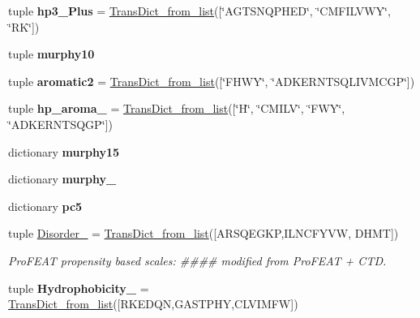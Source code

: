 \begin{DoxyCompactItemize}
\item 
\hypertarget{namespacefeat__extract_1_1_a_alphabets_a948f0c4ce14782492fa9b515f195768a}{}tuple {\bfseries hp3\+\_\+\+Plus} = \hyperlink{namespacefeat__extract_1_1_a_alphabets_acdda8523b57175e0e79064c4da723c5d}{Trans\+Dict\+\_\+from\+\_\+list}(\mbox{[}\char`\"{}A\+G\+T\+S\+N\+Q\+P\+H\+E\+D\char`\"{}, \char`\"{}C\+M\+F\+I\+L\+V\+W\+Y\char`\"{}, \char`\"{}R\+K\char`\"{}\mbox{]})\label{namespacefeat__extract_1_1_a_alphabets_a948f0c4ce14782492fa9b515f195768a}

\item 
tuple {\bfseries murphy10}
\item 
\hypertarget{namespacefeat__extract_1_1_a_alphabets_a73485d177e473b15ac9814b8c1205231}{}tuple {\bfseries aromatic2} = \hyperlink{namespacefeat__extract_1_1_a_alphabets_acdda8523b57175e0e79064c4da723c5d}{Trans\+Dict\+\_\+from\+\_\+list}(\mbox{[}\char`\"{}F\+H\+W\+Y\char`\"{}, \char`\"{}A\+D\+K\+E\+R\+N\+T\+S\+Q\+L\+I\+V\+M\+C\+G\+P\char`\"{}\mbox{]})\label{namespacefeat__extract_1_1_a_alphabets_a73485d177e473b15ac9814b8c1205231}

\item 
\hypertarget{namespacefeat__extract_1_1_a_alphabets_a985e03ae7f398065cf54b12b80d822d2}{}tuple {\bfseries hp\+\_\+aroma\+\_} = \hyperlink{namespacefeat__extract_1_1_a_alphabets_acdda8523b57175e0e79064c4da723c5d}{Trans\+Dict\+\_\+from\+\_\+list}(\mbox{[}\char`\"{}H\char`\"{}, \char`\"{}C\+M\+I\+L\+V\char`\"{}, \char`\"{}F\+W\+Y\char`\"{}, \char`\"{}A\+D\+K\+E\+R\+N\+T\+S\+Q\+G\+P\char`\"{}\mbox{]})\label{namespacefeat__extract_1_1_a_alphabets_a985e03ae7f398065cf54b12b80d822d2}

\item 
dictionary {\bfseries murphy15}
\item 
dictionary {\bfseries murphy\+\_}
\item 
dictionary {\bfseries pc5}
\item 
tuple \hyperlink{namespacefeat__extract_1_1_a_alphabets_aa82e15fb161a0799d632bdadd04c5b99}{Disorder\+\_} = \hyperlink{namespacefeat__extract_1_1_a_alphabets_acdda8523b57175e0e79064c4da723c5d}{Trans\+Dict\+\_\+from\+\_\+list}(\mbox{[}\textquotesingle{}A\+R\+S\+Q\+E\+G\+K\+P\textquotesingle{},\textquotesingle{}I\+L\+N\+C\+F\+Y\+V\+W\textquotesingle{}, \textquotesingle{}D\+H\+M\+T\textquotesingle{}\mbox{]})
\begin{DoxyCompactList}\small\item\em Pro\+F\+E\+A\+T propensity based scales\+: \#\#\#\# modified from Pro\+F\+E\+A\+T + C\+T\+D. \end{DoxyCompactList}\item 
\hypertarget{namespacefeat__extract_1_1_a_alphabets_a4beaeb51c7e1f055ee39c48049652521}{}tuple {\bfseries Hydrophobicity\+\_} = \hyperlink{namespacefeat__extract_1_1_a_alphabets_acdda8523b57175e0e79064c4da723c5d}{Trans\+Dict\+\_\+from\+\_\+list}(\mbox{[}\textquotesingle{}R\+K\+E\+D\+Q\+N\textquotesingle{},\textquotesingle{}G\+A\+S\+T\+P\+H\+Y\textquotesingle{},\textquotesingle{}C\+L\+V\+I\+M\+F\+W\textquotesingle{}\mbox{]})\label{namespacefeat__extract_1_1_a_alphabets_a4beaeb51c7e1f055ee39c48049652521}


\end{DoxyCompactItemize}
